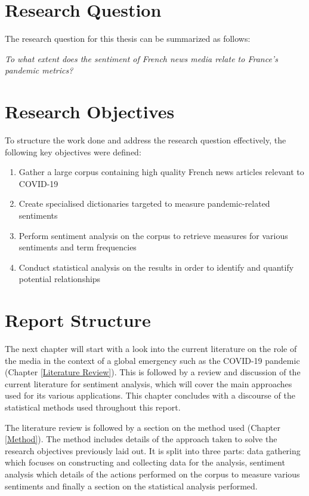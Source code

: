\section{Research Question}\label{Research Question}

The research question for this thesis can be summarized as follows:

\begin{center}
    \emph{To what extent does the sentiment of French news media relate to France's pandemic metrics?}
\end{center}

\section{Research Objectives}\label{Research Objectives}
To structure the work done and address the research question effectively, the following key objectives were defined:
\begin{enumerate}
    \item Gather a large corpus containing high quality French news articles relevant to COVID-19
    \item Create specialised dictionaries targeted to measure pandemic-related sentiments
    \item Perform sentiment analysis on the corpus to retrieve measures for various sentiments and term frequencies
    \item Conduct statistical analysis on the results in order to identify and quantify potential relationships
\end{enumerate}

\section{Report Structure}\label{Report Structure}

The next chapter will start with a look into the current literature on the role of the media in the context of a global emergency such as the COVID-19 pandemic (Chapter \ref{Literature Review}). This is followed by a review and discussion of the current literature for sentiment analysis, which will cover the main approaches used for its various applications. This chapter concludes with a discourse of the statistical methods used throughout this report.

The literature review is followed by a section on the method used (Chapter \ref{Method}). The method includes details of the approach taken to solve the research objectives previously laid out. It is split into three parts: data gathering which focuses on constructing and collecting data for the analysis, sentiment analysis which details of the actions performed on the corpus to measure various sentiments and finally a section on the statistical analysis performed.

